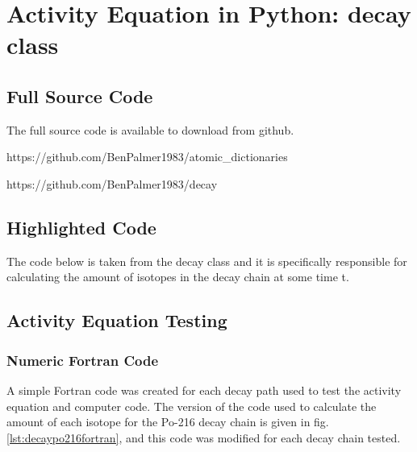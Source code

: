 \chapter{Activity Equation in Python: decay class}
\label{section:decayclass}

\section{Full Source Code}

The full source code is available to download from github.

https://github.com/BenPalmer1983/atomic\_dictionaries

https://github.com/BenPalmer1983/decay



\section{Highlighted Code}

The code below is taken from the decay class and it is specifically responsible for calculating the amount of isotopes in the decay chain at some time t.








\FloatBarrier
\clearpage

\section{Activity Equation Testing}
\subsection{Numeric Fortran Code}
\label{section:decaypo216numeric}

A simple Fortran code was created for each decay path used to test the activity equation and computer code.  The version of the code used to calculate the amount of each isotope for the Po-216 decay chain is given in fig. \ref{lst:decaypo216fortran}, and this code was modified for each decay chain tested.



